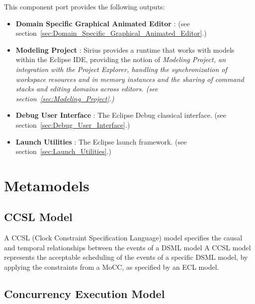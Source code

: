 \documentclass{gemoc} %
\begin{document}
This component port provides the following outputs:
\begin{itemize}
  \item \textbf{Domain Specific Graphical Animated Editor} :
(see section~\ref{sec:Domain_Specific_Graphical_Animated_Editor}.)
  \item \textbf{Modeling Project} :
Sirius provides a runtime that works with models within the Eclipse IDE, providing the notion of \em{Modeling Project}, an integration with the Project Explorer, handling the synchronization of workspace resources and in memory instances and the sharing of command stacks and editing domains across editors.
(see section~\ref{sec:Modeling_Project}.)
  \item \textbf{Debug User Interface} :
The Eclipse Debug classical interface.
(see section~\ref{sec:Debug_User_Interface}.)
  \item \textbf{Launch Utilities} :
The Eclipse launch framework.
(see section~\ref{sec:Launch_Utilities}.)
\end{itemize}


\section{Metamodels}
\subsection{CCSL Model}
\label{sec:CCSL_Model}
A CCSL (Clock Constraint Specification Language) model specifies the causal and temporal relationships between the events of a DSML model
\newline A CCSL model represents the acceptable scheduling of the events of a specific DSML model, by applying the constraints from a MoCC, as specified by an ECL model.

\subsection{Concurrency Execution Model}
\label{sec:Concurrency_Execution_Model}
\end{document}
